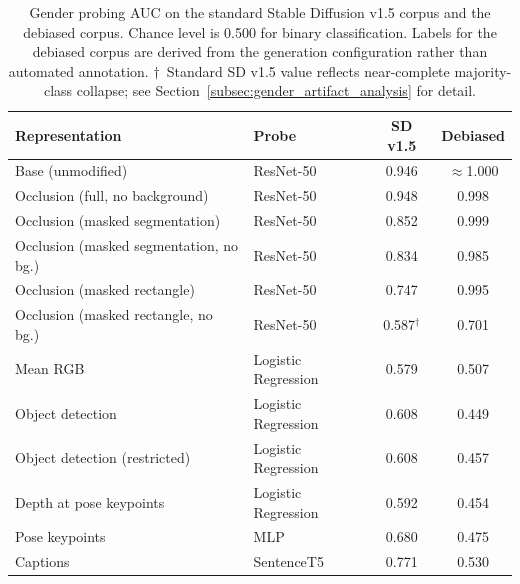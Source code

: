 \begin{table}[htbp]
	\centering
	\begin{tabular}{llcc}
		\toprule
		\textbf{Representation}                 & \textbf{Probe}      & \textbf{SD v1.5} & \textbf{Debiased} \\
		\midrule
		Base (unmodified)                       & ResNet-50           & 0.946            & $\approx$1.000    \\
		Occlusion (full, no background)         & ResNet-50           & 0.948            & 0.998             \\
		Occlusion (masked segmentation)         & ResNet-50           & 0.852            & 0.999             \\
		Occlusion (masked segmentation, no bg.) & ResNet-50           & 0.834            & 0.985             \\
		Occlusion (masked rectangle)            & ResNet-50           & 0.747            & 0.995             \\
		Occlusion (masked rectangle, no bg.)    & ResNet-50           & 0.587$^\dagger$  & 0.701             \\
		\midrule
		Mean RGB                                & Logistic Regression & 0.579            & 0.507             \\
		Object detection                        & Logistic Regression & 0.608            & 0.449             \\
		Object detection (restricted)           & Logistic Regression & 0.608            & 0.457             \\
		Depth at pose keypoints                 & Logistic Regression & 0.592            & 0.454             \\
		Pose keypoints                          & MLP                 & 0.680            & 0.475             \\
		Captions                                & SentenceT5          & 0.771            & 0.530             \\
		\bottomrule
	\end{tabular}
	\caption{Gender probing AUC on the standard Stable Diffusion v1.5 corpus and the
		debiased corpus. Chance level is 0.500 for binary classification. Labels for the
		debiased corpus are derived from the generation configuration rather than
		automated annotation. $\dagger$~Standard SD v1.5 value reflects near-complete
		majority-class collapse; see Section~\ref{subsec:gender_artifact_analysis} for detail.}
	\label{tab:debias_gender_probing}
\end{table}

